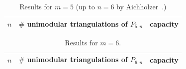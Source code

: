 \begin{table}[ht]
  \centering
  {\footnotesize
  \begin{tabular}{rrr}
    \hline
    \multicolumn{1}{c}{$n$\hspace{10mm}} &
    \multicolumn{1}{c}{$\#$ unimodular triangulations of $P_{5,n}$} &
    \multicolumn{1}{c}{capacity} \\
    \hline
    
    \hline
  \end{tabular}
  }
  \caption{Results for $m=5$ (up to $n=6$ 
    by Aichholzer~\cite{Aichholzer-WWW}.)}
  \label{tab:m5}
\end{table}


\begin{table}[ht]
  \centering
  {\footnotesize
  \begin{tabular}{rrr}
    \hline
    \multicolumn{1}{c}{$n$\hspace{10mm}} &
    \multicolumn{1}{c}{$\#$ unimodular triangulations of $P_{6,n}$} &
    \multicolumn{1}{c}{capacity} \\
    \hline
    
    \hline
  \end{tabular}
  }
  \caption{Results for $m=6$.}
  \label{tab:m6}
\end{table}




